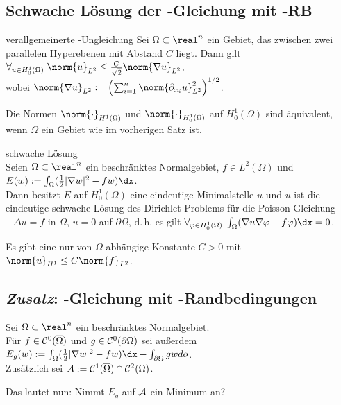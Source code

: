 \subsection{%
    Schwache Lösung der -Gleichung mit -RB%
}

\begin{Satz}{verallgemeinerte -Ungleichung}
    Sei $\Omega \subset \real^n$ ein Gebiet, das zwischen zwei parallelen Hyperebenen
    mit Abstand $C$ liegt.
    Dann gilt $\forall_{u \in H^1_0(\Omega)}\;
    \norm{u}_{L^2} \le \frac{C}{\sqrt{2}} \norm{\nabla u}_{L^2}$,\\
    wobei $\norm{\nabla u}_{L^2} :=
    \left(\sum_{i=1}^n \norm{\partial_{x_i} u}_{L^2}^2\right)^{1/2}$.
\end{Satz}

\begin{Kor}
    Die Normen $\norm{\cdot}_{H^1(\Omega)}$ und $\norm{\cdot}_{H_0^1(\Omega)}$ auf $H_0^1(\Omega)$
    sind äquivalent, wenn $\Omega$ ein Gebiet wie im vorherigen Satz ist.
\end{Kor}

\linie

\begin{Satz}{schwache Lösung}\\
    Seien $\Omega \subset \real^n$ ein beschränktes Normalgebiet, $f \in L^2(\Omega)$ und
    $E(w) := \int_\Omega (\frac{1}{2} |\nabla w|^2 - fw)\dx$.\\
    Dann besitzt $E$ auf $H_0^1(\Omega)$ eine eindeutige Minimalstelle $u$ und $u$ ist die
    eindeutige schwache Lösung des Dirichlet-Problems für die Poisson-Gleichung
    $-\Delta u = f$ in $\Omega$, $u = 0$ auf $\partial\Omega$, d.\,h. es gilt
    $\forall_{\varphi \in H_0^1(\Omega)}\; \int_\Omega (\nabla u \nabla \varphi - f\varphi)\dx = 0$.
\end{Satz}

\begin{Bem}
    Es gibt eine nur von $\Omega$ abhängige Konstante $C > 0$ mit
    $\norm{u}_{H^1} \le C \norm{f}_{L^2}$.
\end{Bem}

\pagebreak

\subsection{%
    \emph{Zusatz}: -Gleichung mit -Randbedingungen%
}

\begin{Bem}
    Sei $\Omega \subset \real^n$ ein beschränktes Normalgebiet.\\
    Für $f \in \mathcal{C}^0(\overline{\Omega})$ und $g \in \mathcal{C}^0(\partial\Omega)$ sei außerdem
    $E_g(w) := \int_\Omega (\frac{1}{2} |\nabla w|^2 - fw) \dx - \int_{\partial\Omega} gw do$.\\
    Zusätzlich sei $\mathcal{A} := \mathcal{C}^1(\overline{\Omega}) \cap \mathcal{C}^2(\Omega)$.

    Das  lautet nun:
    Nimmt $E_g$ auf $\mathcal{A}$ ein Minimum an?
\end{Bem}


